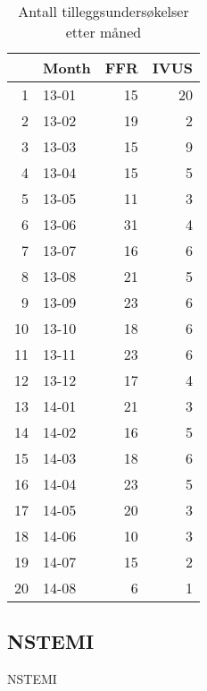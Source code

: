 \documentclass[presentation,xcolor=pdftex,dvipsnames,table]{beamer}
\begin{document}
\begin{frame}
\begin{tiny}
\begin{table}[ht]
\centering
\begin{tabular}{rlrr}
  \toprule
 & Month & FFR & IVUS \\ 
  \midrule
1 & 13-01 & 15 & 20 \\ 
  2 & 13-02 & 19 & 2 \\ 
  3 & 13-03 & 15 & 9 \\ 
  4 & 13-04 & 15 & 5 \\ 
  5 & 13-05 & 11 & 3 \\ 
  6 & 13-06 & 31 & 4 \\ 
  7 & 13-07 & 16 & 6 \\ 
  8 & 13-08 & 21 & 5 \\ 
  9 & 13-09 & 23 & 6 \\ 
  10 & 13-10 & 18 & 6 \\ 
  11 & 13-11 & 23 & 6 \\ 
  12 & 13-12 & 17 & 4 \\ 
  13 & 14-01 & 21 & 3 \\ 
  14 & 14-02 & 16 & 5 \\ 
  15 & 14-03 & 18 & 6 \\ 
  16 & 14-04 & 23 & 5 \\ 
  17 & 14-05 & 20 & 3 \\ 
  18 & 14-06 & 10 & 3 \\ 
  19 & 14-07 & 15 & 2 \\ 
  20 & 14-08 & 6 & 1 \\ 
   \bottomrule
\end{tabular}
\caption{Antall tilleggsundersøkelser etter måned} 
\end{table}\end{tiny}
\end{frame}



\subsection{NSTEMI}

\begin{frame}
\begin{Huge}
NSTEMI
\end{Huge}
\end{frame}
\end{document}
